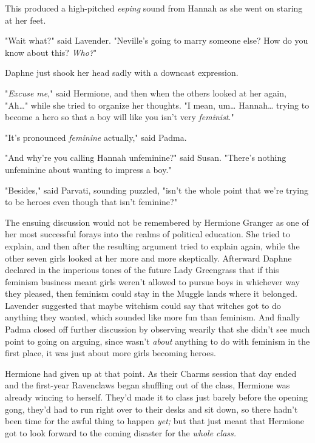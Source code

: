 This produced a high-pitched \emph{eeping} sound from Hannah as she went on 
staring at her feet.

"Wait what?" said Lavender. "Neville's going to marry someone else? How do you 
know about this? \emph{Who?}"

Daphne just shook her head sadly with a downcast expression.

"\emph{Excuse me}," said Hermione, and then when the others looked at her 
again, "Ah{\ldots}" while she tried to organize her thoughts. "I mean, 
um{\ldots} Hannah{\ldots} trying to become a hero so that a boy will like you 
isn't very \emph{feminist}."

"It's pronounced \emph{feminine} actually," said Padma.

"And why're you calling Hannah unfeminine?" said Susan. "There's nothing 
unfeminine about wanting to impress a boy."

"Besides," said Parvati, sounding puzzled, "isn't the whole point that we're 
trying to be heroes even though that isn't feminine?"

The ensuing discussion would not be remembered by Hermione Granger as one of 
her most successful forays into the realms of political education. She tried to 
explain, and then after the resulting argument tried to explain again, while 
the other seven girls looked at her more and more skeptically. Afterward Daphne 
declared in the imperious tones of the future Lady Greengrass that if this 
feminism business meant girls weren't allowed to pursue boys in whichever way 
they pleased, then feminism could stay in the Muggle lands where it belonged. 
Lavender suggested that maybe witchism could say that witches got to do 
anything they wanted, which sounded like more fun than feminism. And finally 
Padma closed off further discussion by observing wearily that she didn't see 
much point to going on arguing, since \SPHEW wasn't \emph{about} anything 
to do with feminism in the first place, it was just about more girls becoming 
heroes.

Hermione had given up at that point.
\sbreak
As their Charms session that day ended and the first-year Ravenclaws began 
shuffling out of the class, Hermione was already wincing to herself. They'd 
made it to class just barely before the opening gong, they'd had to run right 
over to their desks and sit down, so there hadn't been time for the awful thing 
to happen \emph{yet;} but that just meant that Hermione got to look forward to 
the coming disaster for the \emph{whole class.}

